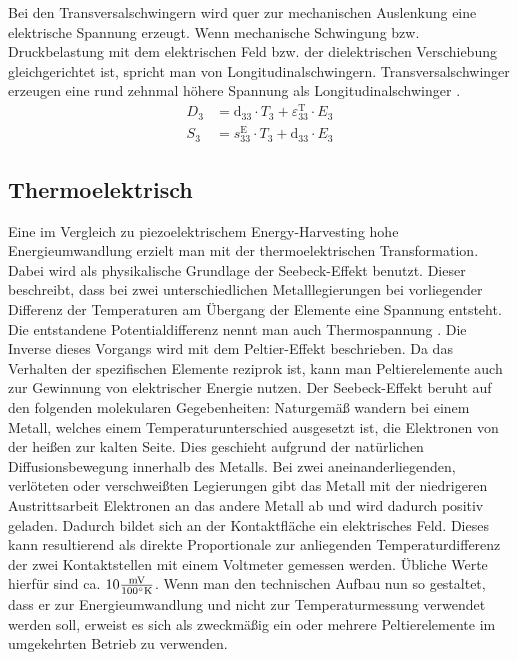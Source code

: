 \documentclass[12pt]{scrreprt} %
\begin{document}
Bei den Transversalschwingern wird quer zur mechanischen Auslenkung eine elektrische Spannung erzeugt. Wenn mechanische Schwingung bzw. Druckbelastung mit dem elektrischen Feld bzw. der dielektrischen Verschiebung gleichgerichtet ist, spricht man von Longitudinalschwingern. Transversalschwinger erzeugen eine rund zehnmal höhere Spannung als Longitudinalschwinger \citep[S.39]{Dembowski2011}.
\begin{align}
D_3 & =  \textrm{d}_{33} \cdot T_3 + \varepsilon_{33}^{\textrm{T}} \cdot E_3 \label{formel:3.5} \\
S_3 & =  s_{33}^{\textrm{E}} \cdot T_3 + \textrm{d}_{33} \cdot E_3 \label{formel:3.6}
\end{align}
\subsection{Thermoelektrisch}
Eine im Vergleich zu piezoelektrischem Energy-Harvesting hohe Energieumwandlung erzielt man mit der thermoelektrischen Transformation. Dabei wird als physikalische Grundlage der Seebeck-Effekt benutzt. Dieser beschreibt, dass bei zwei unterschiedlichen Metalllegierungen bei vorliegender Differenz der Temperaturen am Übergang der Elemente eine Spannung entsteht. Die entstandene Potentialdifferenz nennt man auch Thermospannung \citep[vgl. S.158]{Schruefer2012}. Die Inverse dieses Vorgangs wird mit dem Peltier-Effekt beschrieben. Da das Verhalten der spezifischen Elemente reziprok ist, kann man Peltierelemente auch zur Gewinnung von elektrischer Energie nutzen. \newline
Der Seebeck-Effekt beruht auf den folgenden molekularen Gegebenheiten: Naturgemäß wandern bei einem Metall, welches einem Temperaturunterschied ausgesetzt ist, die Elektronen von der heißen zur kalten Seite. Dies geschieht aufgrund der natürlichen Diffusionsbewegung innerhalb des Metalls. Bei zwei aneinanderliegenden, verlöteten oder verschweißten Legierungen gibt das Metall mit der niedrigeren Austrittsarbeit Elektronen an das andere Metall ab und wird dadurch positiv geladen. Dadurch bildet sich an der Kontaktfläche ein elektrisches Feld. Dieses kann resultierend als direkte Proportionale zur anliegenden Temperaturdifferenz der zwei Kontaktstellen mit einem Voltmeter gemessen werden. Übliche Werte hierfür sind ca. $10  \frac{\textrm{mV}}{100 \degree \textrm{K}}$.\newline \newline
Wenn man den technischen Aufbau nun so gestaltet, dass er zur Energieumwandlung und nicht zur Temperaturmessung verwendet werden soll, erweist es sich als zweckmäßig ein oder mehrere Peltierelemente im umgekehrten Betrieb zu verwenden. \citep[vgl. S.30]{Dembowski2011}
\end{document}
